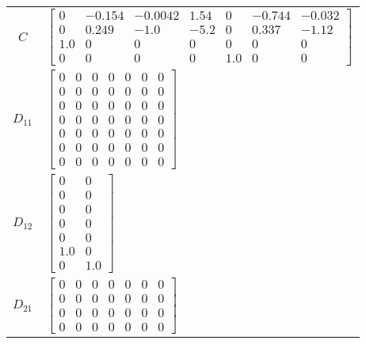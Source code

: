 \begin{tabular}{cl}
   $C$    & $\left[\begin{matrix}0 & -0.154 & -0.0042 & 1.54 & 0 & -0.744 & -0.032\\0 & 0.249 & -1.0 & -5.2 & 0 & 0.337 & -1.12\\1.0 & 0 & 0 & 0 & 0 & 0 & 0\\0 & 0 & 0 & 0 & 1.0 & 0 & 0\end{matrix}\right]$                                                                                                                     \\
 $D_{11}$ & $\left[\begin{matrix}0 & 0 & 0 & 0 & 0 & 0 & 0\\0 & 0 & 0 & 0 & 0 & 0 & 0\\0 & 0 & 0 & 0 & 0 & 0 & 0\\0 & 0 & 0 & 0 & 0 & 0 & 0\\0 & 0 & 0 & 0 & 0 & 0 & 0\\0 & 0 & 0 & 0 & 0 & 0 & 0\\0 & 0 & 0 & 0 & 0 & 0 & 0\end{matrix}\right]$                                                                                  \\
 $D_{12}$ & $\left[\begin{matrix}0 & 0\\0 & 0\\0 & 0\\0 & 0\\0 & 0\\1.0 & 0\\0 & 1.0\end{matrix}\right]$                                                                                                                                                                                                                          \\
 $D_{21}$ & $\left[\begin{matrix}0 & 0 & 0 & 0 & 0 & 0 & 0\\0 & 0 & 0 & 0 & 0 & 0 & 0\\0 & 0 & 0 & 0 & 0 & 0 & 0\\0 & 0 & 0 & 0 & 0 & 0 & 0\end{matrix}\right]$                                                                                                                                                                   \\
\hline
\end{tabular}